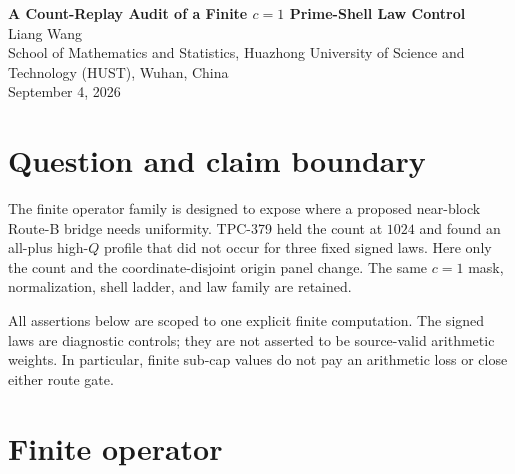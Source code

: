 \documentclass[10pt]{article}
\begin{document}
\small
\begin{center}
{\Large\bf A Count-Replay Audit of a Finite $c=1$ Prime-Shell Law Control}\\[5pt]
Liang Wang\\
School of Mathematics and Statistics, Huazhong University of Science and
Technology (HUST), Wuhan, China\\
September 4, 2026
\end{center}

\begin{abstract}
TPC-379 found that a finite high-$Q$ spectral signature of the all-plus
prime-shell law disappeared under three diagnostic signed controls.  This
paper tests the most immediate continuation: does the separation survive at
the larger fixed count $N=2048$?  On a fresh coordinate-disjoint affine
panel, the complete $3\times3\times4=36$ row experiment again gives the
all-plus profile $(0,3,3)$ and the three signed-control profiles $(0,0,0)$.
There are six spectral-cap failures and no Schur-cap failures.  The result is
finite count persistence with a law-dependence obstruction; it is neither a
scale-uniform theorem nor a twin-prime result.
\end{abstract}

\section{Question and claim boundary}

The finite operator family is designed to expose where a proposed near-block
Route-B bridge needs uniformity.  TPC-379 held the count at $1024$ and found
an all-plus high-$Q$ profile that did not occur for three fixed signed laws.
Here only the count and the coordinate-disjoint origin panel change.  The
same $c=1$ mask, normalization, shell ladder, and law family are retained.

All assertions below are scoped to one explicit finite computation.  The
signed laws are diagnostic controls; they are not asserted to be source-valid
arithmetic weights.  In particular, finite sub-cap values do not pay an
arithmetic loss or close either route gate.

\section{Finite operator}
\end{document}
